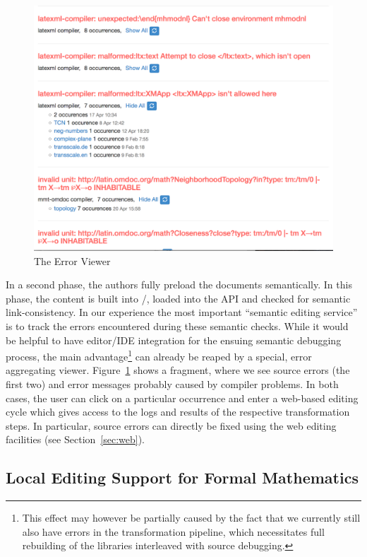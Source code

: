 \begin{figure}[ht]\centering
  \includegraphics[width=\textwidth]{errorview}
  \caption{The \sys Error Viewer}\label{fig:errorview}
\end{figure}

In a second phase, the authors fully preload the documents semantically. In this phase,
the content is built into \omdoc/\mmt, loaded into the \mmt API and checked for semantic
link-consistency. In our experience the most important ``semantic editing service'' is to
track the errors encountered during these semantic checks. While it would be helpful to
have editor/IDE integration for the ensuing semantic debugging process, the main
advantage\footnote{This effect may however be partially caused by the fact that we
  currently still also have errors in the transformation pipeline, which necessitates full
  rebuilding of the \sys libraries interleaved with source debugging.}  can already be
reaped by a special, error aggregating viewer.  Figure~\ref{fig:errorview} shows a
fragment, where we see source errors (the first two) and error messages probably caused by
compiler problems. In both cases, the user can click on a particular occurrence and
enter a web-based editing cycle which gives access to the logs and results of the
respective transformation steps. In particular, source errors can directly be fixed using the web
editing facilities (see Section~\ref{sec:web}).


\subsection{Local Editing Support for Formal Mathematics}\label{sec:local-formal}

